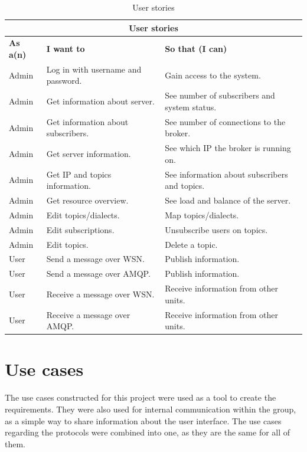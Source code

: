 \begin{table}[ht!]
\centering
\begin{tabular}{|l|p{5cm}|p{3cm}|}
\hline
\multicolumn{3}{|c|}{\textbf{User stories}} \\ \hline
\textbf{As a(n)} & \textbf{I want to} & \textbf{So that (I can)}  \\ \hline
Admin & Log in with username and password. & Gain access to the system. \\ \hline
Admin & Get information about server. & See number of subscribers and system status.  \\ \hline
Admin & Get information about subscribers. & See number of connections to the broker.  \\ \hline
Admin & Get server information. & See which IP the broker is running on. \\ \hline
Admin & Get IP and topics information. & See information about subscribers and topics. \\ \hline
Admin & Get resource overview. & See load and balance of the server. \\ \hline
Admin & Edit topics/dialects. & Map topics/dialects. \\ \hline
Admin & Edit subscriptions. & Unsubscribe users on topics. \\ \hline
Admin & Edit topics. & Delete a topic. \\ \hline
User & Send a message over WSN. & Publish information. \\ \hline
User & Send a message over AMQP. & Publish information. \\ \hline
User & Receive a message over WSN. & Receive information from other units. \\ \hline
User & Receive a message over AMQP. & Receive information from other units. \\ \hline
\end{tabular}
\caption{User stories}
\label{user-stories}
\end{table}

\clearpage

\section{Use cases}

The use cases constructed for this project were used as a tool to create the requirements. They were also used for internal communication within the group, as a simple way to share information about the user interface. The use cases regarding the protocols were combined into one, as they are the same for all of them.

